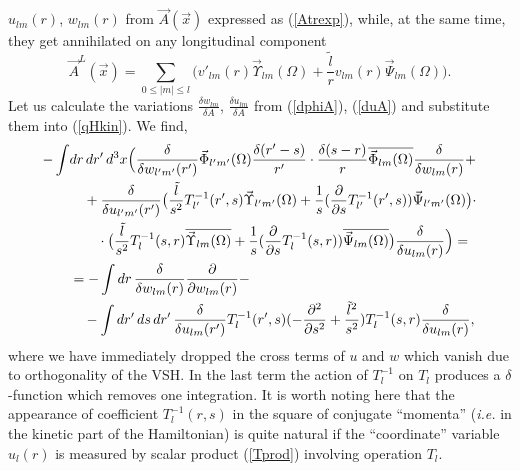 \documentclass[12pt]{article}
\newcommand{\pl}{\partial}
\newcommand{\ol}{\overline}
\begin{document}
$ u_{lm}(r) $,
$ w_{lm}(r) $ from
$ \vec{A}(\vec{x}) $
	expressed as 
(\ref{Atrexp}),
	while, at the same time, they get annihilated on any longitudinal component
\begin{equation*}
    \vec{A}^{L}(\vec{x}) = \sum_{0\leq |m| \leq l} \bigl(
	v'_{lm}(r)\vec{\Upsilon}_{lm}(\Omega) +\frac{\tilde{l}}{r}v_{lm}(r)
	    \vec{\Psi}_{lm}(\Omega)\bigr) .
\end{equation*}
	Let us calculate the variations
$ \frac{\delta w_{lm}}{\delta A} $,
$ \frac{\delta u_{lm}}{\delta A} $
	from
(\ref{dphiA}),
(\ref{duA}) and substitute them into
(\ref{qHkin}).
	We find,
\begin{align*}
    -\int& dr\, dr'\, d^{3}x \Bigl(\frac{\delta}{\delta w_{l'm'}(r')}
\vec{\Phi}_{l'm'}(\Omega) \frac{\delta(r'-s)}{r'} \cdot
	\frac{\delta(s-r)}{r} \ol{\vec{\Phi}_{lm}(\Omega)}
	    \frac{\delta}{\delta w_{lm}(r)}
    +\\
&\quad +\frac{\delta}{\delta u_{l'm'}(r')}
    \bigl(\frac{\tilde{l}}{s^{2}} T_{l'}^{-1}(r',s)
	\vec{\Upsilon}_{l'm'}(\Omega)
    +\frac{1}{s}(\frac{\pl}{\pl s}T_{l'}^{-1}(r',s))\vec{\Psi}_{l'm'}(\Omega)
	\bigr)\cdot \\
&\quad\quad \cdot \bigl(\frac{\tilde{l}}{s^{2}}T_{l}^{-1}(s,r)
    \ol{\vec{\Upsilon}_{lm}(\Omega)} +\frac{1}{s}(\frac{\pl}{\pl s}
    T_{l}^{-1}(s,r))\ol{\vec{\Psi}_{lm}(\Omega)} \bigr)
	\frac{\delta}{\delta u_{lm}(r)} \Bigr) =\\
&= -\int dr\, \frac{\delta}{\delta w_{lm}(r)} \frac{\pl}{\pl w_{lm}(r)} -\\
&\quad    -\int dr'\, ds\, dr'\, \frac{\delta}{\delta u_{lm}(r')}
    T_{l}^{-1}(r',s)
    (-\frac{\pl^{2}}{\pl s^{2}}+\frac{\tilde{l}^{2}}{s^{2}})
    T_{l}^{-1}(s,r) \frac{\delta}{\delta u_{lm}(r)} ,
\end{align*}
	where we have immediately dropped the cross terms of
$ u $ and
$ w $
	which vanish due to orthogonality of the VSH.
	In the last term the action of
$ T_{l}^{-1} $ on
$ T_{l} $
	produces a
$ \delta $-function
	which removes one integration.
	It is worth noting here that the appearance of coefficient
$ T_{l}^{-1}(r,s) $
	in the square of conjugate ``momenta''
	({\it i.e.} in the kinetic part of the Hamiltonian) is quite natural
	if the ``coordinate'' variable 
$ u_{l}(r) $
	is measured by scalar product
(\ref{Tprod})
	involving operation
$ T_{l} $.
\end{document}
